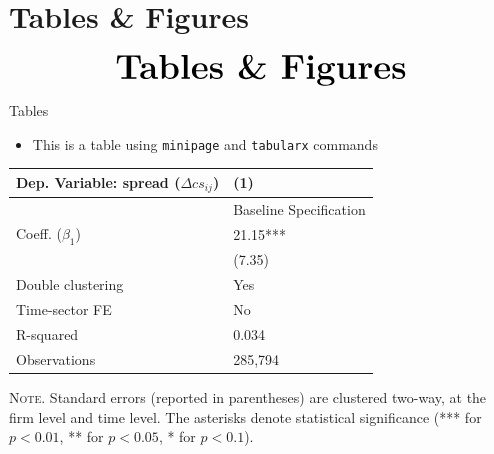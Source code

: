 \documentclass[10pt]{beamer}
\begin{document}

\section{Tables \& Figures}
\begin{frame}
	\begin{eqnarray*}
		&\text{{\Huge \textbf{Tables \& Figures}}}\\
	\end{eqnarray*}
\end{frame}


\begin{frame}
	{Tables}
	\begin{itemize}
		\item This is a table using \texttt{minipage} and \texttt{tabularx} commands
	\end{itemize}
	\begin{table}[th]
		\centering%
		\begin{minipage}[b]{.5\textwidth}
			\vspace{.2cm}\tablesize
			\begin{tabularx}{\textwidth}{lY}
				\toprule
				Dep. Variable: spread ($\Delta cs_{ij}$) 	& (1)\\
				\midrule
				& {Baseline Specification} \\
				\midrule
				 Coeff. ($\beta_1$) 		&  21.15*** \\
				&   (7.35) \\
				\midrule
				 Double clustering 		& Yes \\
				Time-sector FE 												& No \\
				 R-squared 					& 0.034 \\
				Observations 												& 285,794 \\\bottomrule
			\end{tabularx}\vspace{.2cm}\newline
			\tiny{{\scshape Note.} Standard errors (reported in parentheses) are clustered two-way, at the firm level and time level. The asterisks denote statistical significance (*** for $p<0.01$, ** for $p<0.05$, * for $p<0.1$).\newline}%
			\label{tab:label}%
		\end{minipage}
	\end{table}
\end{frame}
\end{document}
